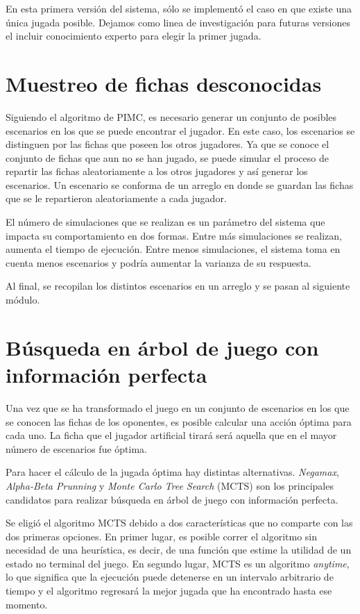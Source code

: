 En esta primera versión del sistema, sólo se implementó el caso en que existe
una única jugada posible. Dejamos como linea de investigación para futuras
versiones el incluir conocimiento experto para elegir la primer jugada.

\section{Muestreo de fichas desconocidas}

Siguiendo el algoritmo de PIMC, es necesario generar un conjunto de posibles
escenarios en los que se puede encontrar el jugador. En este caso, los
escenarios se distinguen por las fichas que poseen los otros jugadores. Ya que
se conoce el conjunto de fichas que aun no se han jugado, se puede simular el
proceso de repartir las fichas aleatoriamente a los otros jugadores y así
generar los escenarios. Un escenario se conforma de un arreglo en donde se
guardan las fichas que se le repartieron aleatoriamente a cada jugador.

El número de simulaciones que se realizan es un parámetro del sistema que
impacta su comportamiento en dos formas. Entre más simulaciones se realizan,
aumenta el tiempo de ejecución. Entre menos simulaciones, el sistema toma en
cuenta menos escenarios y podría aumentar la varianza de su respuesta.

Al final, se recopilan los distintos escenarios en un arreglo y se pasan al
siguiente módulo.

\section{Búsqueda en árbol de juego con información perfecta}

Una vez que se ha transformado el juego en un conjunto de escenarios en los que
se conocen las fichas de los oponentes, es posible calcular una acción óptima
para cada uno. La ficha que el jugador artificial tirará será aquella que en el
mayor número de escenarios fue óptima.

Para hacer el cálculo de la jugada óptima hay distintas alternativas.
\textit{Negamax}, \textit{Alpha-Beta Prunning} y \textit{Monte Carlo Tree
Search} (MCTS) son los principales candidatos para realizar búsqueda en árbol de
juego con información perfecta.

Se eligió el algoritmo MCTS debido a dos características que no comparte con las
dos primeras opciones. En primer lugar, es posible correr el algoritmo sin
necesidad de una heurística, es decir, de una función que estime la utilidad de
un estado no terminal del juego. En segundo lugar, MCTS es un algoritmo
\textit{anytime}, lo que significa que la ejecución puede detenerse en un
intervalo arbitrario de tiempo y el algoritmo regresará la mejor jugada que ha
encontrado hasta ese momento.

